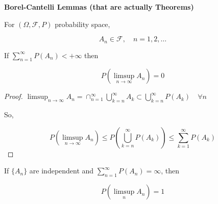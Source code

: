 \documentclass[11pt,fleqn]{book} %
\begin{document}
\textbf{Borel-Cantelli Lemmas (that are actually Theorems)}


\begin{theorem}[BC1]	
	For $(\Omega, \mathcal{F}, P)$ probability space, 

	$$A_n \in \mathcal{F}, \quad n= 1, 2, \dots$$

	If $\displaystyle \sum^\infty_{n=1} P(A_n) < + \infty$ then

	$$P(\limsup_{n \rightarrow \infty} A_n) = 0 $$
\end{theorem}	

\begin{proof}
	$\limsup_{n \rightarrow \infty} A_n = \cap^\infty_{n=1} \bigcup^\infty_{k=n} A_k \subset \bigcup^\infty_{k=n} P(A_k) \quad \forall n$

	So, 

	$$P(\limsup_{n \rightarrow \infty} A_n) \leq P( \bigcup^\infty_{k=n} P(A_k)) \leq \sum^\infty_{k=1} P(A_k)$$

\end{proof}

\begin{theorem}[BC2]
	If $\{A_n\}$ are independent and $\displaystyle \sum^\infty_{n=1} P(A_n) = \infty$, then

	$$P(\limsup_n A_n) = 1 $$
\end{theorem}
\end{document}
